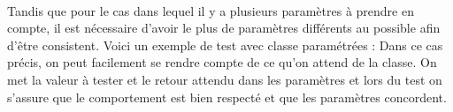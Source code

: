 \paragraph{}
Tandis que pour le cas dans lequel il y a plusieurs paramètres à prendre en compte, il est nécessaire d'avoir le plus de paramètres différents au possible afin d'être consistent. Voici un exemple de test avec classe paramétrées :
Dans ce cas précis, on peut facilement se rendre compte de ce qu'on attend de la classe. On met la valeur à tester et le retour attendu dans les paramètres et lors du test on s'assure que le comportement est bien respecté et que les paramètres concordent.
